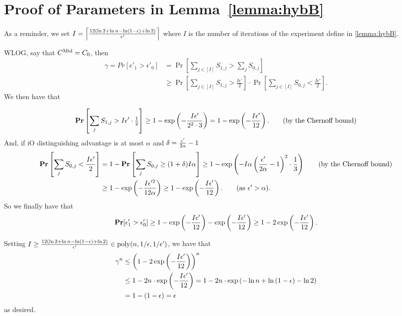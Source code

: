 \section{Proof of Parameters in Lemma~\ref{lemma:hybB}}
\label{appendix:paramHybB}

As a reminder, we set $I =\left\lceil \frac{12\left(\ln 2 + \ln n - \ln\left(1 - \epsilon\right) + \ln 2\right)}{\epsilon'} \right\rceil$ where $I$
is the number of iterations of the experiment define in \cref{lemma:hybB}.

WLOG, say that $C^{\text{Mid}} = C_0$, then
\begin{align*}
	\gamma = Pr[\epsilon'_1 > \epsilon'_0] &= \Pr\left[\sum_{j \in [I]} S_{1, j} > \sum_{j} S_{0, j}\right]\\
	&\geq \Pr\left[\sum_{j \in [I]} S_{1, j} > \frac{I\epsilon'}{2}\right] \cdot \Pr\left[\sum_{j \in [I]} S_{0, j} < \frac{I\epsilon'}{2}\right].
\end{align*}
We then have that

\begin{align*}
	\operatorname*{\mathbf{Pr}}\left[\sum_{j} S_{1, j} > I\epsilon' \cdot \tfrac{1}{2}\right] \geq 1 - \exp\left( -\frac{I\epsilon'}{2^2 \cdot 3}\right) =  1 - \exp\left( -\frac{I\epsilon'}{12}\right). \tag{by the Chernoff bound}
\end{align*}
And, if iO distinguishing advantage is at most $\alpha$ and $\delta = \frac{\epsilon'}{2\alpha} - 1$
\begin{align*}
	\Pr\left[\sum_{j} S_{0, j} < \frac{I\epsilon'}{2}\right] &= 1 - \Pr\left[\sum_{j} S_{0, j} \geq  (1 + \delta) I\alpha\right]
	\geq 1 - \exp\left( - I \alpha \left(\frac{\eps'}{2\alpha} - 1\right)^2 \cdot \frac{1}{3} \right) \tag{by the Chernoff bound}\\
	&\geq 1 - \exp\left( - \frac{I\eps'^2}{12\alpha}\right) \geq 1 - \exp\left(-\frac{I\eps'}{12}\right). \tag{as $\eps' > \alpha$}.
\end{align*}
So we finally have that
\begin{equation}
	\operatorname*{\mathbf{Pr}}[\epsilon'_1 > \epsilon'_0] \geq 1 - \exp\left(-\frac{I\epsilon'}{12}\right) - \exp\left( -\frac{I\epsilon'}{12}\right) \geq 1 - 2\exp\left( -\frac{I\epsilon'}{12}\right). 
\end{equation}

Setting $I \geq \frac{12\left(\ln 2 + \ln n - \ln\left(1 - \epsilon\right) + \ln 2\right)}{\epsilon'} \in \operatorname{poly}(n, 1/\epsilon, 1/\epsilon')$, we have that
\begin{align*}
	\gamma^n &\leq \left(1 - 2\exp\left( -\frac{I\epsilon'}{12}\right)\right)^n \\
	&\leq 1 - 2n \cdot \exp\left( -\frac{I\epsilon'}{12}\right) = 1 - 2n \cdot \exp\left(-\ln n + \ln\left(1 - \epsilon\right) - \ln 2\right)\\
	&= 1 - \left(1 - \epsilon\right) = \epsilon
\end{align*}
as desired.
